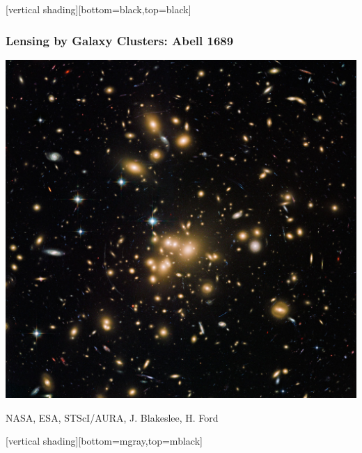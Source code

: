 \documentclass{beamer}
\begin{document}
{
    [vertical shading][bottom=black,top=black]
	
    \frame
    {
        \frametitle{Lensing by Galaxy Clusters: Abell 1689}

        \begin{center}
            \includegraphics[height=0.8\textheight]{abell1689_hubble_1280.jpg}

            {\tiny \hfill NASA, ESA, STScI/AURA, J. Blakeslee, H. Ford}
        \end{center}
    }

    [vertical shading][bottom=mgray,top=mblack]

}
\end{document}
